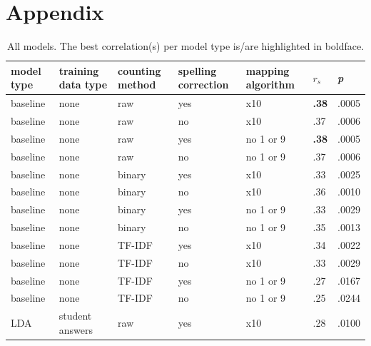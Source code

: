 \documentclass[a4paper,10pt,twoside]{article}
\begin{document}
\newpage
\section*{Appendix}
\begin{table}[h]
	\centering
	\footnotesize
	\caption{All models. The best correlation(s) per model type is/are highlighted in boldface.}
	\label{all-models}
	\begin{tabular}{lllllll}
		\hline model type & training data type & counting method & spelling correction & mapping algorithm & $\textit{r}_s$   & \textit{p} \\
		\hline baseline   & none               & raw             & yes                 & x10               & \textbf{.38} & .0005       \\
		baseline   & none               & raw             & no                  & x10               & .37 & .0006       \\
		baseline   & none               & raw             & yes                 & no 1 or 9         & \textbf{.38} & .0005       \\
		baseline   & none               & raw             & no                  & no 1 or 9         & .37 & .0006       \\
		baseline   & none               & binary          & yes                 & x10               & .33 & .0025       \\
		baseline   & none               & binary          & no                  & x10               & .36 & .0010       \\
		baseline   & none               & binary          & yes                 & no 1 or 9         & .33 & .0029       \\
		baseline   & none               & binary          & no                  & no 1 or 9         & .35 & .0013       \\
		baseline   & none               & TF-IDF          & yes                 & x10               & .34 & .0022       \\
		baseline   & none               & TF-IDF          & no                  & x10               & .33 & .0029       \\
		baseline   & none               & TF-IDF          & yes                 & no 1 or 9         & .27 & .0167       \\
		baseline   & none               & TF-IDF          & no                  & no 1 or 9         & .25 & .0244       \\
		LDA        & student answers    & raw             & yes                 & x10               & .28 & .0100       \\

\end{tabular}
\end{table}
\end{document}
